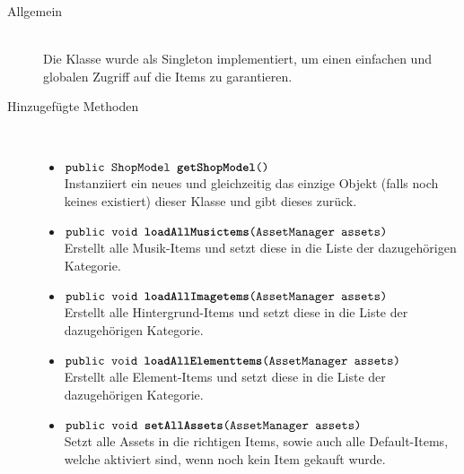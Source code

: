 \begin{description}

\item[Allgemein] \hfill \\ Die Klasse wurde als Singleton implementiert, um einen einfachen und globalen Zugriff auf die Items zu garantieren.

\item[Hinzugefügte Methoden] \hfill \\
	\vspace{-.8cm}
	\begin{itemize}
		\item $\texttt{public ShopModel \textbf{getShopModel}()}$ \\ Instanziiert ein neues und gleichzeitig das einzige Objekt (falls noch keines existiert) dieser Klasse und gibt dieses zurück.
		\item $\texttt{public void \textbf{loadAllMusictems}(AssetManager assets)}$ \\ Erstellt alle Musik-Items und setzt diese in die Liste der dazugehörigen Kategorie.
		\item $\texttt{public void \textbf{loadAllImagetems}(AssetManager assets)}$ \\ Erstellt alle Hintergrund-Items und setzt diese in die Liste der dazugehörigen Kategorie. 
		\item $\texttt{public void \textbf{loadAllElementtems}(AssetManager assets)}$ \\ Erstellt alle Element-Items und setzt diese in die Liste der dazugehörigen Kategorie.
		\item $\texttt{public void \textbf{setAllAssets}(AssetManager assets)}$ \\ Setzt alle Assets in die richtigen Items, sowie auch alle Default-Items, welche aktiviert sind, wenn noch kein Item gekauft wurde. 
		\end{itemize}
\end{description}